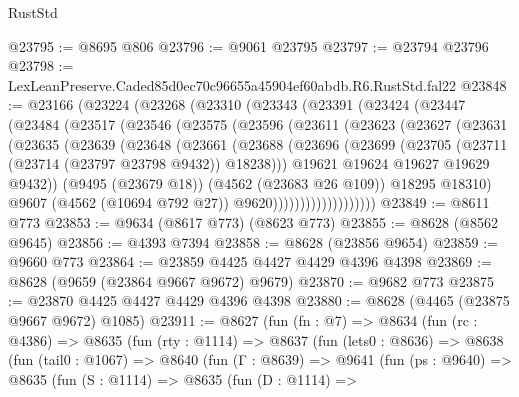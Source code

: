 \begin{lexlean}{RustStd}
\begin{coremodule}
@23795 := @8695 @806
@23796 := @9061 @23795
@23797 := @23794 @23796
@23798 := LexLeanPreserve.Caded85d0ec70c96655a45904ef60abdb.R6.RustStd.fal22
@23848 := @23166
    (@23224
      (@23268
        (@23310
          (@23343
            (@23391
              (@23424
                (@23447
                  (@23484
                    (@23517
                      (@23546
                        (@23575
                          (@23596
                            (@23611
                              (@23623
                                (@23627
                                  (@23631
                                    (@23635
                                      (@23639
                                        (@23648
                                          (@23661
                                            (@23688
                                              (@23696
                                                (@23699
                                                  (@23705
                                                    (@23711 (@23714 (@23797 @23798 @9432)) @18238)))
                                                @19621
                                                @19624
                                                @19627
                                                @19629
                                                @9432))
                                            (@9495 (@23679 @18))
                                            (@4562 (@23683 @26 @109))
                                            @18295
                                            @18310)
                                          @9607
                                          (@4562 (@10694 @792 @27))
                                          @9620)))))))))))))))))))
@23849 := @8611 @773
@23853 := @9634 (@8617 @773) (@8623 @773)
@23855 := @8628 (@8562 @9645)
@23856 := @4393 @7394
@23858 := @8628 (@23856 @9654)
@23859 := @9660 @773
@23864 := @23859 @4425 @4427 @4429 @4396 @4398
@23869 := @8628 (@9659 (@23864 @9667 @9672) @9679)
@23870 := @9682 @773
@23875 := @23870 @4425 @4427 @4429 @4396 @4398
@23880 := @8628 (@4465 (@23875 @9667 @9672) @1085)
@23911 := @8627
    (fun (fn : @7) =>
    @8634
      (fun (rc : @4386) =>
      @8635
        (fun (rty : @1114) =>
        @8637
          (fun (lets0 : @8636) =>
          @8638
            (fun (tail0 : @1067) =>
            @8640
              (fun (Γ : @8639) =>
              @9641
                (fun (ps : @9640) =>
                @8635
                  (fun (S : @1114) =>
                  @8635
                    (fun (D : @1114) =>

\end{coremodule}
\end{lexlean}

